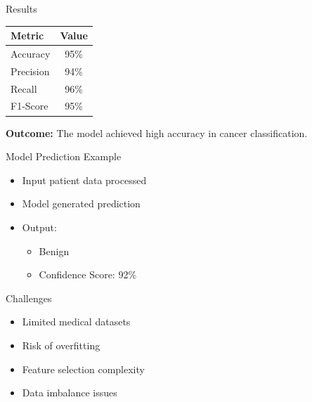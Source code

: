 \documentclass{beamer}
\begin{document}

\begin{frame}{Results}

\begin{table}
\centering
\begin{tabular}{lc}
\toprule
Metric & Value \\
\midrule
Accuracy & 95\% \\
Precision & 94\% \\
Recall & 96\% \\
F1-Score & 95\% \\
\bottomrule
\end{tabular}
\end{table}

\vspace{0.5cm}

\textbf{Outcome:}
The model achieved high accuracy in cancer classification.

\end{frame}


\begin{frame}{Model Prediction Example}

\begin{itemize}
\item Input patient data processed
\item Model generated prediction
\item Output:
\begin{itemize}
\item Benign
\item Confidence Score: 92\%
\end{itemize}
\end{itemize}

\end{frame}


\begin{frame}{Challenges}
\begin{itemize}
\item Limited medical datasets
\item Risk of overfitting
\item Feature selection complexity
\item Data imbalance issues
\end{itemize}
\end{frame}
\end{document}
